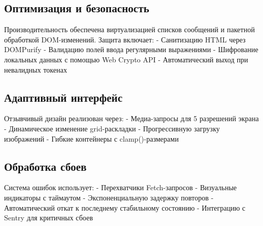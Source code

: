 		\subsection{Оптимизация и безопасность}
		Производительность обеспечена виртуализацией списков сообщений и пакетной обработкой DOM-изменений. Защита включает:
		- Санитизацию HTML через DOMPurify 
		- Валидацию полей ввода регулярными выражениями
		- Шифрование локальных данных с помощью Web Crypto API
		- Автоматический выход при невалидных токенах
		
		\subsection{Адаптивный интерфейс}
		Отзывчивый дизайн реализован через:
		- Медиа-запросы для 5 разрешений экрана
		- Динамическое изменение grid-раскладки
		- Прогрессивную загрузку изображений 
		- Гибкие контейнеры с clamp()-размерами
		
		\subsection{Обработка сбоев}
		Система ошибок использует:
		- Перехватчики Fetch-запросов 
		- Визуальные индикаторы с таймаутом
		- Экспоненциальную задержку повторов
		- Автоматический откат к последнему стабильному состоянию
		- Интеграцию с Sentry для критичных сбоев
